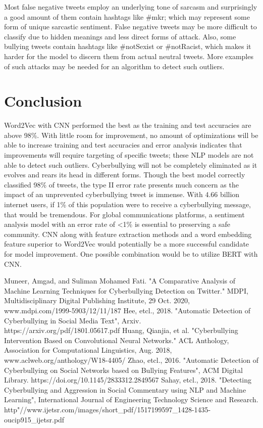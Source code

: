 \documentclass[conference]{IEEEtran}
\begin{document}
Most false negative tweets employ an underlying tone of sarcasm and surprisingly a good amount of them contain hashtags like \#mkr; which may represent some form of unique sarcastic sentiment. False negative tweets may be more difficult to classify due to hidden meanings and less direct forms of attack. Also, some bullying tweets contain hashtags like \#notSexist or \#notRacist, which makes it harder for the model to discern them from actual neutral tweets. More examples of such attacks may be needed for an algorithm to detect such outliers.

\section{Conclusion}

Word2Vec with CNN performed the best as the training and test accuracies are above 98\%. With little room for improvement, no amount of optimizations will be able to increase training and test accuracies and error analysis indicates that improvements will require targeting of specific tweets; these NLP models are not able to detect such outliers.
	Cyberbullying will not be completely eliminated as it evolves and rears its head in different forms. Though the best model correctly classified 98\% of tweets, the type II error rate presents much concern as the impact of an unprevented cyberbullying tweet is immense. With 4.66 billion internet users, if 1\% of this population were to receive a cyberbullying message, that would be tremendous. For global communications platforms, a sentiment analysis model with an error rate of  <1\% is essential to preserving a safe community. CNN along with feature extraction methods and a word embedding feature superior to Word2Vec would potentially be a more successful candidate for model improvement. One possible combination would be to utilize BERT with CNN.


\begin{thebibliography}{00}
 Muneer, Amgad, and Suliman Mohamed Fati. "A Comparative Analysis of Machine Learning Techniques for Cyberbullying Detection on Twitter." MDPI, Multidisciplinary Digital Publishing Institute, 29 Oct. 2020, www.mdpi.com/1999-5903/12/11/187
 Hee, etcl., 2018. "Automatic Detection of Cyberbullying in Social Media Text", Arxiv. https://arxiv.org/pdf/1801.05617.pdf
 Huang, Qianjia, et al. "Cyberbullying Intervention Based on Convolutional Neural Networks." ACL Anthology, Association for Computational Linguistics, Aug. 2018, www.aclweb.org/anthology/W18-4405/
 Zhao, etcl., 2016. "Automatic Detection of Cyberbullying on Social Networks based on Bullying Features", ACM Digital Library. https://doi.org/10.1145/2833312.2849567
 Sahay, etcl., 2018. "Detecting Cyberbullying and Aggression in Social Commentary using NLP and Machine Learning", International Journal of Engineering Technology Science and Research. http"//www.ijetsr.com/images/short\_pdf/1517199597\_1428-1435-oucip915\_ijetsr.pdf
\end{thebibliography}
\vspace{12pt}
\end{document}
